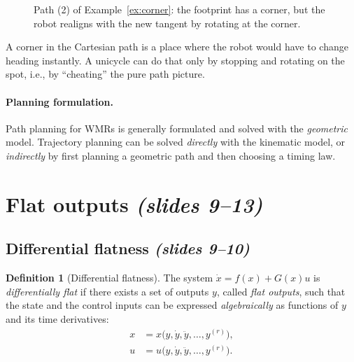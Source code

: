 \documentclass[11pt,a4paper]{article}
\def\boldsymbol#1{#1}%
\theoremstyle{definition}
\newtheorem{definition}{Definition}[section]
\theoremstyle{plain}
\theoremstyle{remark}
\begin{document}
\begin{figure}[H]
\centering
{}
\caption{Path (2) of Example~\ref{ex:corner}: the footprint has a corner, but the robot realigns with the new tangent by rotating at the corner.}
\end{figure}
\begin{intuition}
A corner in the Cartesian path is a place where the robot would have to change heading instantly. A unicycle can do
that only by stopping and rotating on the spot, i.e., by ``cheating'' the pure path picture.
\end{intuition}

\paragraph{Planning formulation.} Path planning for WMRs is generally formulated and solved with the \emph{geometric}
model. Trajectory planning can be solved \emph{directly} with the kinematic model, or \emph{indirectly} by first planning a
geometric path and then choosing a timing law.

\section{Flat outputs \emph{(slides 9--13)}}

\subsection{Differential flatness \emph{(slides 9--10)}}

\begin{definition}[Differential flatness]
The system $\dot{\boldsymbol x}=f(\boldsymbol x)+G(\boldsymbol x)\boldsymbol u$ is \emph{differentially flat} if there exists a set of
outputs $\boldsymbol y$, called \emph{flat outputs}, such that the state and the control inputs can be expressed
\emph{algebraically} as functions of $\boldsymbol y$ and its time derivatives:
\begin{align}
\boldsymbol x&=\boldsymbol x\big(\boldsymbol y,\dot{\boldsymbol y},\ddot{\boldsymbol y},\dots,\boldsymbol y^{(r)}\big),\\
\boldsymbol u&=\boldsymbol u\big(\boldsymbol y,\dot{\boldsymbol y},\ddot{\boldsymbol y},\dots,\boldsymbol y^{(r)}\big).
\end{align}
\end{definition}
\end{document}
